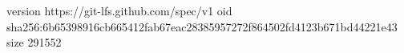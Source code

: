 version https://git-lfs.github.com/spec/v1
oid sha256:6b65398916cb665412fab67eac28385957272f864502fd4123b671bd44221e43
size 291552
